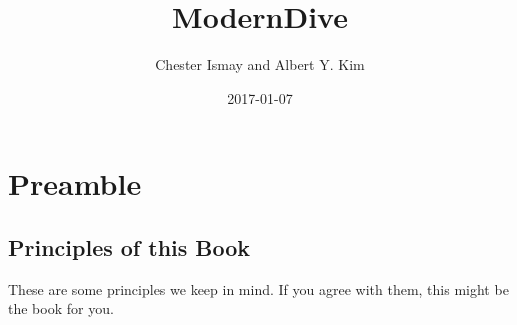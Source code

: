 \documentclass[]{tufte-book}
\title{ModernDive}
\author{Chester Ismay and Albert Y. Kim}
\date{2017-01-07}
\begin{document}
\let\allcaps=\relax
\maketitle



{
\setcounter{tocdepth}{1}
\tableofcontents
}

\chapter{Preamble}\label{preamble}

\section{Principles of this Book}\label{principles-of-this-book}

These are some principles we keep in mind. If you agree with them, this
might be the book for you.
\end{document}

